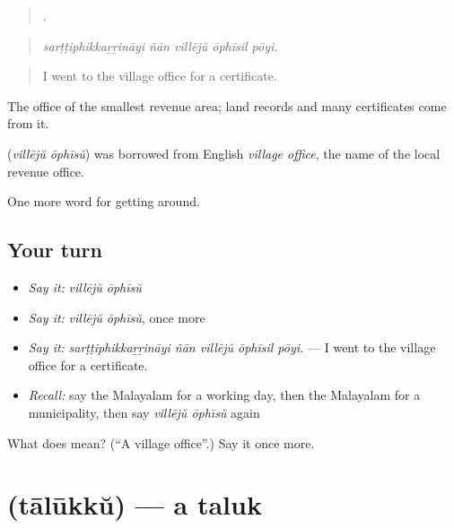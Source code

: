 \begin{quote}
    .
\end{quote}

\begin{quote}
\emph{sarṭṭiphikkaṟṟināyi ñān villējŭ ōphīsil pōyi.}
\end{quote}

\begin{quote}
I went to the village office for a certificate.
\end{quote}

The office of the smallest revenue area; land records and many certificates come from it.

\begin{cousinweb}
\textbf{ } (\emph{villējŭ ōphīsŭ}) was borrowed from English \emph{village office}, the name of the local revenue office.
\end{cousinweb}

\begin{grammarlens}[title={What you've built}]
One more word for getting around.
\end{grammarlens}

\subsection*{Your turn}
\begin{itemize}
\raggedright
  \item \emph{Say it:} \emph{villējŭ ōphīsŭ}
  \item \emph{Say it:} \emph{villējŭ ōphīsŭ}, once more
  \item \emph{Say it:} \emph{sarṭṭiphikkaṟṟināyi ñān villējŭ ōphīsil pōyi.} — I went to the village office for a certificate.
  \item \emph{Recall:} say the Malayalam for a working day, then the Malayalam for a municipality, then say \emph{villējŭ ōphīsŭ} again
\end{itemize}

\begin{tcolorbox}[breakable,colback=teal!4,colframe=teal!35!black,title={Before you move on}]
What does   mean? (\textquotedblleft{}A village office\textquotedblright{}.) Say it once more.
\end{tcolorbox}
\section[\texorpdfstring{\ml{താലൂക്ക്} (tālūkkŭ)}{താലൂക്ക് (tālūkkŭ)}]{ (tālūkkŭ) — a taluk}

